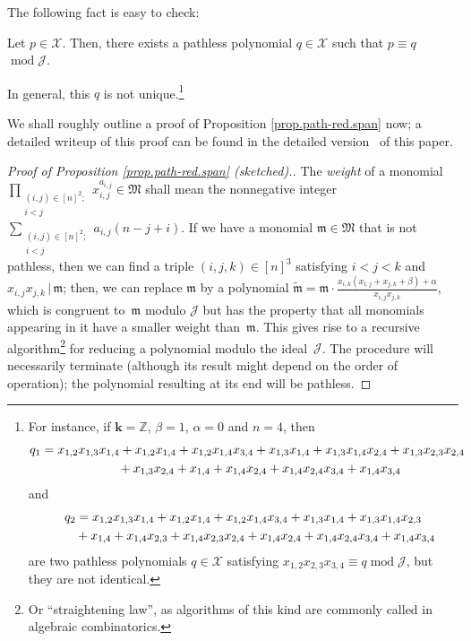 The following fact is easy to check:

\begin{Proposition}\label{prop.path-red.span}Let $p\in\mathcal{X}$. Then, there exists a pathless polynomial $q\in\mathcal{X}$ such that $p\equiv q$ $\operatorname{mod} \mathcal{J}$.
\end{Proposition}

In general, this $q$ is not unique.\footnote{For instance, if $\mathbf{k}=\mathbb{Z}$, $\beta=1$, $\alpha=0$ and $n=4$, then
\begin{gather*}
q_{1} =x_{1,2}x_{1,3}x_{1,4}+x_{1,2}x_{1,4}+x_{1,2}x_{1,4}x_{3,4} +x_{1,3}x_{1,4}+x_{1,3}x_{1,4}x_{2,4}+x_{1,3}x_{2,3}x_{2,4}\\
\hphantom{q_{1} =}{} +x_{1,3}x_{2,4}+x_{1,4}+x_{1,4}x_{2,4}+x_{1,4}x_{2,4}x_{3,4}+x_{1,4}x_{3,4}%
\end{gather*}
and%
\begin{gather*}
q_{2} =x_{1,2}x_{1,3}x_{1,4}+x_{1,2}x_{1,4}+x_{1,2}x_{1,4}x_{3,4}+x_{1,3}x_{1,4}+x_{1,3}x_{1,4}x_{2,3}\\
\hphantom{q_{2} =}{} +x_{1,4}+x_{1,4}x_{2,3}+x_{1,4}x_{2,3}x_{2,4}+x_{1,4}x_{2,4}+x_{1,4}x_{2,4}x_{3,4}+x_{1,4}x_{3,4}
\end{gather*}
are two pathless polynomials $q\in\mathcal{X}$ satisfying $x_{1,2}x_{2,3}x_{3,4}\equiv q\operatorname{mod}\mathcal{J}$, but they are not identical.}

We shall roughly outline a proof of Proposition \ref{prop.path-red.span} now; a detailed writeup of this proof can be found in the detailed version~\cite{verlong} of this paper.

\begin{proof}[Proof of Proposition \ref{prop.path-red.span} (sketched).]The \textit{weight} of a monomial $\prod_{\substack{(i,j) \in[n] ^{2};\\i<j}}x_{i,j}^{a_{i,j}}\in\mathfrak{M}$ shall mean the nonnegative integer $\sum_{\substack{(i,j) \in[n] ^{2};\\i<j}}a_{i,j}(n-j+i) $. If we have a monomial $\mathfrak{m}\in\mathfrak{M}$ that is not pathless, then we can find a triple $ (i,j,k) \in[n] ^{3}$ satisfying $i<j<k$ and $x_{i,j}x_{j,k}\,|\,\mathfrak{m}$; then, we can replace $\mathfrak{m}$ by a polynomial $\widetilde{\mathfrak{m}}=\mathfrak{m}\cdot\frac{x_{i,k}(x_{i,j}+x_{j,k}+\beta) +\alpha}{x_{i,j}x_{j,k}}$, which is congruent to~$\mathfrak{m}$ modulo $\mathcal{J}$ but has the property that all monomials appearing in it have a smaller weight than~$\mathfrak{m}$. This gives rise to a recursive algorithm\footnote{Or ``straightening law'', as algorithms of this kind are commonly called in algebraic combinatorics.} for reducing a polynomial modulo the ideal~$\mathcal{J}$. The procedure will necessarily terminate (although its result might depend on the order of operation); the polynomial resulting at its end will be pathless.
\end{proof}

